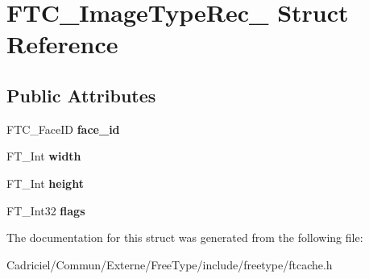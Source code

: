 \hypertarget{struct_f_t_c___image_type_rec__}{\section{F\-T\-C\-\_\-\-Image\-Type\-Rec\-\_\- Struct Reference}
\label{struct_f_t_c___image_type_rec__}
}
\subsection*{Public Attributes}
\begin{DoxyCompactItemize}
\item 
\hypertarget{struct_f_t_c___image_type_rec___a9851b8d4a06baacd18d5b9856fd85abd}{F\-T\-C\-\_\-\-Face\-I\-D {\bfseries face\-\_\-id}}\label{struct_f_t_c___image_type_rec___a9851b8d4a06baacd18d5b9856fd85abd}

\item 
\hypertarget{struct_f_t_c___image_type_rec___af1a4cccbabb0f5852ed755a12ed08dd8}{F\-T\-\_\-\-Int {\bfseries width}}\label{struct_f_t_c___image_type_rec___af1a4cccbabb0f5852ed755a12ed08dd8}

\item 
\hypertarget{struct_f_t_c___image_type_rec___adb56a9d18a3f522d713d0ba01c1a8778}{F\-T\-\_\-\-Int {\bfseries height}}\label{struct_f_t_c___image_type_rec___adb56a9d18a3f522d713d0ba01c1a8778}

\item 
\hypertarget{struct_f_t_c___image_type_rec___a391782ed8c67de86591c71f276ea6454}{F\-T\-\_\-\-Int32 {\bfseries flags}}\label{struct_f_t_c___image_type_rec___a391782ed8c67de86591c71f276ea6454}

\end{DoxyCompactItemize}


The documentation for this struct was generated from the following file\-:\begin{DoxyCompactItemize}
\item 
Cadriciel/\-Commun/\-Externe/\-Free\-Type/include/freetype/ftcache.\-h\end{DoxyCompactItemize}
